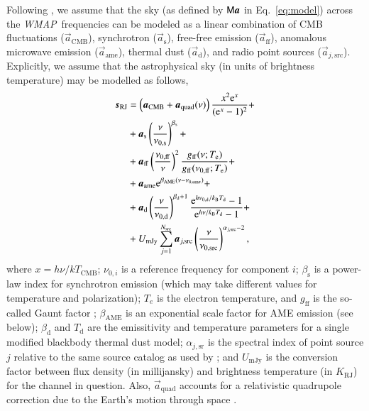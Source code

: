 \documentclass[twocolumn]{../../common/aa}
\def\WMAP{\emph{WMAP}}
\renewcommand{\a}[0]{\vec{a}}
\newcommand{\M}[0]{\tens{M}}
\newcommand{\Te}[0]{T_{\rm e}}
\newcommand{\e}{\mathrm e}
\def\Tdust{\ifmmode T_\mathrm{d}\else $T_{\mathrm{d}}$\fi}
\def\bdust{\ifmmode \beta_\mathrm{d}\else $\beta_{\mathrm{d}}$\fi}
\def\bsynch{\ifmmode \beta_\mathrm{s}\else $\beta_{\mathrm{s}}$\fi}
\def\nuzeros{\ifmmode \nu_{0,\mathrm{s}}\else $\nu_{0,\mathrm{s}}$\fi}
\def\nuzeroff{\ifmmode \nu_{0,\mathrm{ff}}\else $\nu_{0,\mathrm{ff}}$\fi}
\def\nuzerod{\ifmmode \nu_{0,\mathrm{d}}\else $\nu_{0,\mathrm{d}}$\fi}
\def\nuzeroame{\ifmmode \nu_{0,\mathrm{ame}}\else $\nu_{0,\mathrm{ame}}$\fi}
\def\nuzerosrc{\ifmmode \nu_{0,\mathrm{src}}\else $\nu_{0,\mathrm{src}}$\fi}
\def\nup{\ifmmode \nu_{\mathrm{p}}\else $\nu_{\mathrm{p}}$\fi}
\def\Te{\ifmmode T_{\mathrm{e}}\else $T_{\mathrm{e}}$\fi}
\def\kB{\ifmmode k_\mathrm{B}\else $k_{\mathrm{B}}$\fi}
\begin{document}
Following \citet{bp01}, we assume that the sky (as defined by $\M\boldsymbol a$ in Eq.~\ref{eq:model}) across the \WMAP\ frequencies can be modeled as a linear combination of CMB fluctuations ($\vec{a}_{\mathrm{CMB}}$), synchrotron ($\vec{a}_{\mathrm{s}}$), free-free emission ($\vec{a}_{\mathrm{ff}}$), anomalous microwave emission ($\vec{a}_{\mathrm{ame}}$), thermal dust ($\vec{a}_{\mathrm{d}}$), and radio point sources ($\vec{a}_{j,\mathrm{src}}$). Explicitly, we assume that the astrophysical sky (in units of brightness temperature) may be modelled as follows,
\begin{align}
  \vec{s}_{\mathrm{RJ}} &= \left(\vec{a}_{\mathrm{CMB}}+\vec{a}_{\mathrm{quad}}(\nu)\right) \frac{x^2 \e^x}{(\e^x -1)^2}+\label{eq:cmb_astsky}\\
  &+ \vec{a}_{\mathrm{s}} \left(\frac{\nu}{\nuzeros}\right)^{\bsynch} + \label{eq:synch_astsky}\\
  &+ \vec{a}_{\mathrm{ff}} \left(\frac{\nuzeroff}{\nu}\right)^2 \frac{g_{\mathrm{ff}}(\nu;\Te) }{g_{\mathrm{ff}}(\nuzeroff;\Te)} +\label{eq:ff_astsky}\\
  &+ \vec{a}_{\mathrm{ame}} \e^{\beta_{\mathrm{AME}}(\nu-\nu_{0,\mathrm{ame}})}+\label{eq:ame_astsky}  \\
  &+ \vec{a}_{\mathrm{d}} \left(\frac{\nu}{\nuzerod}\right)^{\bdust+1} \frac{\e^{h\nuzerod/\kB\Tdust}-1}{\e^{h\nu/\kB\Tdust}-1}+ \label{eq:dust_astsky}\\
  &+ U_{\mathrm{mJy}} \sum_{j=1}^{N_{\mathrm{src}}} \vec{a}_{j,\mathrm{src}} \left(\frac{\nu}{\nuzerosrc}\right)^{\alpha_{j,\mathrm{src}}-2}, \label{eq:sum_ptsrc}
\end{align}
where $x=h\nu/kT_{\mathrm{CMB}}$; $\nu_{0,i}$ is a reference frequency for component $i$; $\beta_{\mathrm{s}}$ is a power-law index for synchrotron emission (which may take different values for temperature and polarization); $T_e$ is the electron temperature, and $g_{\mathrm{ff}}$ is the so-called Gaunt factor \citet{dickinson2003}; $\beta_{\mathrm{AME}}$ is an exponential scale factor for AME emission (see below); $\beta_{\mathrm{d}}$ and $T_{\mathrm{d}}$ are the emissitivity and temperature parameters for a single modified blackbody thermal dust model; $\alpha_{j,\mathrm{sr}}$ is the spectral index of point source $j$ relative to the same source catalog as used by \citet{planck2016-l04}; and $U_{\mathrm{mJy}}$ is the conversion factor between flux density (in millijansky) and brightness temperature (in $K_{\mathrm{RJ}}$) for the channel in question. Also, $\a_{\mathrm{quad}}$ accounts for a relativistic quadrupole correction due to the Earth's motion through space \citep{Notari:2015}.
\end{document}
